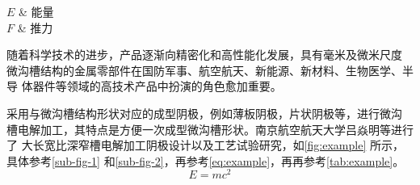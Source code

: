 \documentclass[
  type=master
]{gdutthesis}
\begin{document}
\begin{abstract}
  \zhlipsum[1-4]
\end{abstract}

\begin{abstract*}
  \lipsum[1-4]
\end{abstract*}

\begin{notation}
  $E$ & 能量 \\
  $F$ & 推力
\end{notation}

\gduttableofcontents

\mainmatter


随着科学技术的进步，产品逐渐向精密化和高性能化发展，具有毫米及微米尺度
微沟槽结构的金属零部件在国防军事、航空航天、新能源、新材料、生物医学、半导
体器件等领域的高技术产品中扮演的角色愈加重要。

采用与微沟槽结构形状对应的成型阴极，例如薄板阴极，片状阴极等，进行微沟
槽电解加工，其特点是方便一次成型微沟槽形状。南京航空航天大学吕焱明等进行了
大长宽比深窄槽电解加工阴极设计以及工艺试验研究\cite{chendengyuan2000guoshi}，如\autoref{fig:example} 所示，具体参考\autoref{sub-fig-1} 和\autoref{sub-fig-2}，再参考\autoref{eq:example}，再再参考\autoref{tab:example}。
\begin{equation}\label{eq:example}
  E = mc^2
\end{equation}

\begin{figure}[htbp]
  \qquad
  \label{fig:example}
\end{figure}
\end{document}
